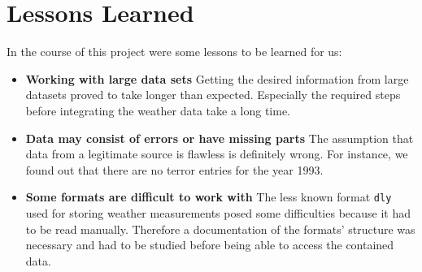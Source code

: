 \section{Lessons Learned}

In the course of this project were some lessons to be learned for us:
\begin{itemize}
	\item \textbf{Working with large data sets} Getting the desired information from large datasets proved to take longer than expected. Especially the required steps before integrating the weather data take a long time.
	\item \textbf{Data may consist of errors or have missing parts} The assumption that data from a legitimate source is flawless is definitely wrong. For instance, we found out that there are no terror entries for the year 1993.
	\item \textbf{Some formats are difficult to work with} The less known format \texttt{dly} used for storing weather measurements posed some difficulties because it had to be read manually. Therefore a documentation of the formats' structure was necessary and had to be studied before being able to access the contained data.
\end{itemize}